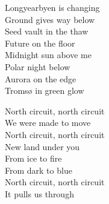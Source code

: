 \begin{lyrics}
Longyearbyen is changing\\
Ground gives way below\\
Seed vault in the thaw\\
Future on the floor\\
Midnight sun above me\\
Polar night below\\
Aurora on the edge\\
Tromsø in green glow

North circuit, north circuit\\
We were made to move\\
North circuit, north circuit\\
New land under you\\
From ice to fire\\
From dark to blue\\
North circuit, north circuit\\
It pulls us through
\end{lyrics}

